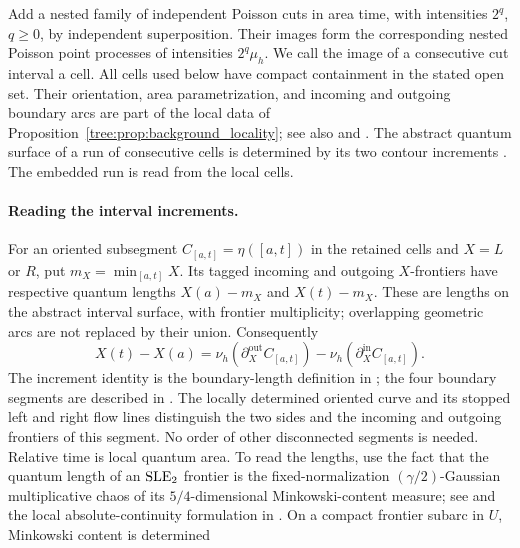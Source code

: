 Add a nested family of independent Poisson cuts in area time, with
intensities $2^q$, $q\geq0$, by independent superposition.  Their images
form the corresponding nested Poisson point processes of intensities
$2^q\mu_h$.  We call the image of a consecutive cut interval a cell.
All cells used below have compact containment in the stated open set.
Their orientation, area parametrization, and incoming and outgoing
boundary arcs are part of the local data of
Proposition~\ref{tree:prop:background_locality}; see also
\cite[Lemma~2.4]{GwynneMillerSheffieldHarmonic} and \cite[Lemma~3.7]{ContrerasHipGwynneCurvature}.
The abstract quantum surface of a run of consecutive cells is determined
by its two contour increments
\cite[Lemma~4.9]{GHSSurvey}.  The embedded run is read from the local cells.

\paragraph{Reading the interval increments.}
For an oriented subsegment $C_{[a,t]}=\eta([a,t])$ in the retained
cells and $X=L$ or $R$, put $m_X=\min_{[a,t]}X$.  Its tagged incoming
and outgoing $X$-frontiers have respective quantum lengths
$X(a)-m_X$ and $X(t)-m_X$.  These are lengths on the abstract interval
surface, with frontier multiplicity; overlapping geometric arcs are
not replaced by their union.  Consequently
\begin{equation}\label{tree:eq:local_frontier_increment}
 X(t)-X(a)=\nu_h(\partial_X^{\mathrm{out}}C_{[a,t]})
                 -\nu_h(\partial_X^{\mathrm{in}}C_{[a,t]}).
\end{equation}
The increment identity is the boundary-length definition in
\cite[Equation~(4.3), p.~35, and Figure~8, p.~36]{GHSSurvey};
the four boundary segments are described in
\cite[discussion following the proof of Corollary~9.3, p.~152]{DMS}.
The locally determined oriented curve and its stopped left and right
flow lines distinguish the two sides and the incoming and outgoing
frontiers of this segment. No order of other disconnected segments is
needed. Relative time is local quantum area. To read the lengths, use
the fact that the quantum
length of an $\mathrm{SLE}_2$ frontier is the fixed-normalization
$(\gamma/2)$-Gaussian multiplicative chaos of its $5/4$-dimensional
Minkowski-content measure; see
\cite[Definition~2.11 and Proposition~3.3]{BenoistLength} and the
local absolute-continuity formulation in
\cite[paragraph following Theorem~4.1, p.~33]{GHSSurvey}.
On a compact frontier subarc in $U$, Minkowski content is determined
